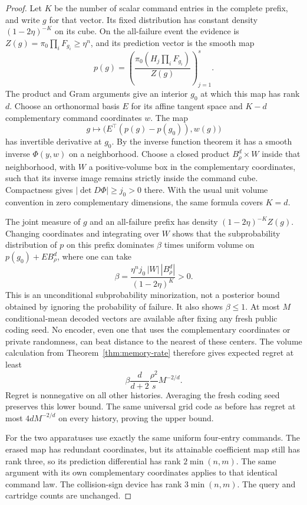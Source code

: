 \begin{proof}
Let $K$ be the number of scalar command entries in the complete prefix,
and write $g$ for that vector. Its fixed distribution has constant density
$(1-2\eta)^{-K}$ on its cube. On the all-failure event the evidence is
$Z(g)=\pi_0\prod_iF_{g_i}\ge\eta^n$, and its prediction vector is the
smooth map
\[
 p(g)=\left(\frac{\pi_0(H_j\prod_iF_{g_i})}{Z(g)}\right)_{j=1}^s.
\]
The product and Gram arguments give an interior $g_0$ at which this map
has rank $d$. Choose an orthonormal basis $E$ for its affine tangent
space and $K-d$ complementary command coordinates $w$. The map
\[
 g\longmapsto\bigl(E^\top(p(g)-p(g_0)),w(g)\bigr)
\]
has invertible derivative at $g_0$. By the inverse function theorem it has
a smooth inverse $\Phi(y,w)$ on a neighborhood. Choose a closed product
$B_\rho^d\times W$ inside that neighborhood, with $W$ a positive-volume
box in the complementary coordinates, such that its inverse image remains
strictly inside the command cube. Compactness gives
$|\det D\Phi|\ge j_0>0$ there. With the usual unit volume convention in
zero complementary dimensions, the same formula covers $K=d$.

The joint measure of $g$ and an all-failure prefix has density
$(1-2\eta)^{-K}Z(g)$. Changing coordinates and integrating over $W$ shows
that the subprobability distribution of $p$ on this prefix dominates
$\beta$ times uniform volume on $p(g_0)+EB_\rho^d$, where one can take
\[
 \beta=\frac{\eta^n j_0\,|W|\,|B_\rho^d|}{(1-2\eta)^K}>0.
\]
This is an unconditional subprobability minorization, not a posterior
bound obtained by ignoring the probability of failure. It also shows
$\beta\le1$. At most $M$ conditional-mean decoded vectors are available
after fixing any fresh public coding seed. No encoder, even one that uses
the complementary coordinates or private randomness, can beat distance
to the nearest of these centers. The volume calculation from
Theorem~\ref{thm:memory-rate} therefore gives expected regret at least
\[
 \beta\frac{d}{d+2}\frac{\rho^2}{s}M^{-2/d}.
\]
Regret is nonnegative on all other histories. Averaging the fresh coding
seed preserves this lower bound. The same universal grid code as before
has regret at most $4dM^{-2/d}$ on every history, proving the upper bound.

For the two apparatuses use exactly the same uniform four-entry commands.
The erased map has redundant coordinates, but its attainable coefficient
map still has rank three, so its prediction differential has rank
$2\min(n,m)$. The same argument with its own complementary coordinates
applies to that identical command law. The collision-sign device has rank
$3\min(n,m)$. The query and cartridge counts are unchanged.
\end{proof}

